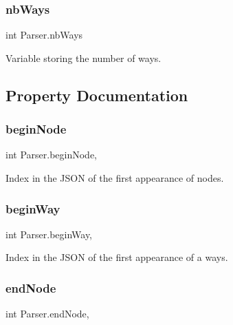 \subsubsection{\texorpdfstring{nb\+Ways}{nbWays}}
{\footnotesize\ttfamily int Parser.\+nb\+Ways\hspace{0.3cm}{\ttfamily [private]}}



Variable storing the number of ways.



\subsection{Property Documentation}
\mbox{\label{classParser_a43e10a5d0cd10c4fdc3f00d329f2663e}} 
\subsubsection{\texorpdfstring{begin\+Node}{beginNode}}
{\footnotesize\ttfamily int Parser.\+begin\+Node\hspace{0.3cm}{\ttfamily [get]}, {}}



Index in the J\+S\+ON of the first appearance of nodes.

\mbox{\label{classParser_a08f610cc9cddb8527b5925faeb2bbb3c}} 
\subsubsection{\texorpdfstring{begin\+Way}{beginWay}}
{\footnotesize\ttfamily int Parser.\+begin\+Way\hspace{0.3cm}{\ttfamily [get]}, {}}



Index in the J\+S\+ON of the first appearance of a ways.

\mbox{\label{classParser_a94de8556b93d0d47a9d86fd4e11c59e5}} 
\subsubsection{\texorpdfstring{end\+Node}{endNode}}
{\footnotesize\ttfamily int Parser.\+end\+Node\hspace{0.3cm}{\ttfamily [get]}, {}}



